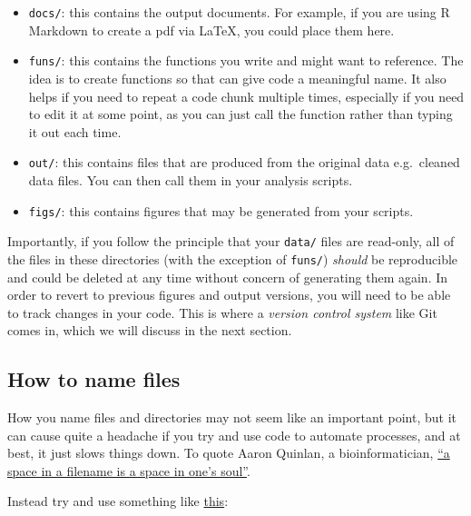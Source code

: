 \documentclass[]{book}
\providecommand{\tightlist}{%
  \setlength{\itemsep}{0pt}\setlength{\parskip}{0pt}}
\begin{document}
\begin{itemize}
\tightlist
\item
  \texttt{docs/}: this contains the output documents. For example, if you are using R Markdown to create a pdf via LaTeX, you could place them here.
\item
  \texttt{funs/}: this contains the functions you write and might want to reference. The idea is to create functions so that can give code a meaningful name. It also helps if you need to repeat a code chunk multiple times, especially if you need to edit it at some point, as you can just call the function rather than typing it out each time.
\item
  \texttt{out/}: this contains files that are produced from the original data e.g.~cleaned data files. You can then call them in your analysis scripts.
\item
  \texttt{figs/}: this contains figures that may be generated from your scripts.
\end{itemize}

Importantly, if you follow the principle that your \texttt{data/} files are read-only, all of the files in these directories (with the exception of \texttt{funs/}) \emph{should} be reproducible and could be deleted at any time without concern of generating them again. In order to revert to previous figures and output versions, you will need to be able to track changes in your code. This is where a \emph{version control system} like Git comes in, which we will discuss in the next section.

\hypertarget{how-to-name-files}{%
\subsection{How to name files}\label{how-to-name-files}}

How you name files and directories may not seem like an important point, but it can cause quite a headache if you try and use code to automate processes, and at best, it just slows things down. To quote Aaron Quinlan, a bioinformatician, \href{https://twitter.com/aaronquinlan/status/711593127551733761}{``a space in a filename is a space in one's soul''}.

Instead try and use something like \href{https://speakerdeck.com/jennybc/how-to-name-files}{this}:
\end{document}
